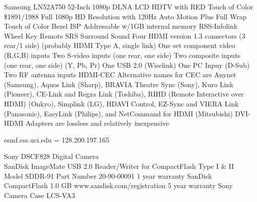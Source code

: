 \documentclass[12pt,twoside]{article}
\begin{document}
Samsung LN52A750 52-Inch 1080p DLNA LCD HDTV with RED Touch of Color
\$1891/1988
Full 1080p HD Resolution with 120Hz Auto Motion Plus
Full Wrap Touch of Color Bezel
ISP Addressable w/1GB internal memory
RSS-Infolink
Wheel Key Remote
SRS Surround Sound
Four HDMI version 1.3 connectors (3 rear/1 side) (probably HDMI Type A, single link)
One set component video (R,G,B) inputs
Two S-video inputs (one rear, one side)
Two composite inputs (one rear, one side) (Y, Pb, Pr) 
One USB 2.0 (Wiselink)
One PC Inpuy (D-Sub)
Two RF antenna inputs 
HDMI-CEC
Alternative names for CEC are Anynet (Samsung), Aquos Link (Sharp), BRAVIA Theatre Sync (Sony), Kuro Link (Pioneer), CE-Link and Regza Link (Toshiba), RIHD (Remote Interactive over HDMI) (Onkyo), Simplink (LG), HDAVI Control, EZ-Sync and VIERA Link (Panasonic), EasyLink (Philips), and NetCommand for HDMI (Mitsubishi)
DVI-HDMI Adapters are lossless and relatively inexpensive

esmf.ess.uci.edu = 128.200.197.165

Sony DSCF828 Digital Camera \\
SanDisk ImageMate USB 2.0 Reader/Writer for CompactFlash Type I \& II
Model SDDR-91 
Part Number 20-90-00091
1 year warranty
SanDisk CompactFlash 1.0 GB www.sandisk.com/registration
5 year warranty
Sony Camera Case  LCS-VA3
\end{document}
